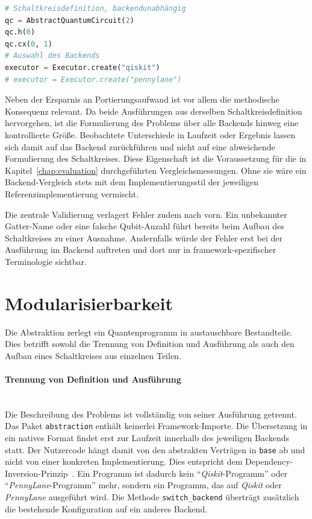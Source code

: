 \begin{lstlisting}[language=Python]
# Schaltkreisdefinition, backendunabhängig
qc = AbstractQuantumCircuit(2)
qc.h(0)
qc.cx(0, 1)
# Auswahl des Backends
executor = Executor.create("qiskit")
# executor = Executor.create("pennylane")
\end{lstlisting}

Neben der Ersparnis an Portierungsaufwand ist vor allem die methodische
Konsequenz relevant. Da beide Ausführungen aus derselben Schaltkreisdefinition
hervorgehen, ist die Formulierung des Problems über alle Backends hinweg eine
kontrollierte Größe. Beobachtete Unterschiede in Laufzeit oder Ergebnis lassen
sich damit auf das Backend zurückführen und nicht auf eine abweichende
Formulierung des Schaltkreises. Diese Eigenschaft ist die Voraussetzung für die
in Kapitel~\ref{chap:evaluation} durchgeführten Vergleichsmessungen. Ohne sie
wäre ein Backend-Vergleich stets mit dem Implementierungsstil der jeweiligen
Referenzimplementierung vermischt.

Die zentrale Validierung verlagert Fehler zudem nach vorn. Ein unbekannter
Gatter-Name oder eine falsche Qubit-Anzahl führt bereits beim Aufbau des
Schaltkreises zu einer Ausnahme. Andernfalls würde der Fehler erst bei der
Ausführung im Backend auftreten und dort nur in framework-spezifischer
Terminologie sichtbar.

\section{Modularisierbarkeit}
\label{sec:vorteile_modular}

Die Abstraktion zerlegt ein Quantenprogramm in austauschbare Bestandteile. Dies
betrifft sowohl die Trennung von Definition und Ausführung als auch den Aufbau
eines Schaltkreises aus einzelnen Teilen.

\paragraph*{Trennung von Definition und Ausführung}\mbox{}\\
Die Beschreibung des Problems ist vollständig von seiner Ausführung getrennt.
Das Paket \texttt{abstraction} enthält keinerlei Framework-Importe. Die
Übersetzung in ein natives Format findet erst zur Laufzeit innerhalb des
jeweiligen Backends statt. Der Nutzercode hängt damit von den abstrakten
Verträgen in \texttt{base} ab und nicht von einer konkreten Implementierung. Dies
entspricht dem Dependency-Inversion-Prinzip~\cite{martin2003agile}. Ein Programm
ist dadurch kein \enquote{\textit{Qiskit}-Programm} oder
\enquote{\textit{PennyLane}-Programm} mehr, sondern ein Programm, das auf
\textit{Qiskit} oder \textit{PennyLane} ausgeführt wird. Die Methode
\texttt{switch\_backend} überträgt zusätzlich die bestehende Konfiguration auf
ein anderes Backend.

